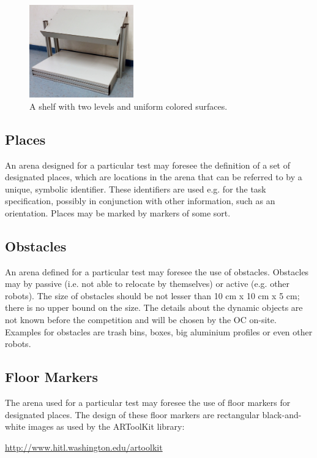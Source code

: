 \begin{figure} [h!]
\centering
\includegraphics[width=0.4\textwidth ]{./images/shelf.jpg}
\caption{A shelf with two levels and uniform colored surfaces.}
\label{fig:shelf}
\end{figure}


\subsection{Places}
An arena designed for a particular test may foresee the definition of a set of designated places, which are locations in the arena that can be referred to by a unique, symbolic identifier. These identifiers are used e.g. for the task specification, possibly in conjunction with other information, such as an orientation. Places may be marked by markers of some sort.

\subsection{Obstacles}
An arena defined for a particular test may foresee the use of obstacles. Obstacles may by passive (i.e. not able to relocate by themselves) or active (e.g. other robots). The size of obstacles should be not lesser than 10 cm x 10 cm x 5 cm; there is no upper bound on the size. The details about the dynamic objects are not known before the competition and will be chosen by the OC on-site. Examples for obstacles are trash bins, boxes, big aluminium profiles or even other robots.

\subsection{Floor Markers}
The arena used for a particular test may foresee the use of floor markers for designated places. The design of these floor markers are rectangular black-and-white images as used by the ARToolKit library:
\begin{center}
\url{http://www.hitl.washington.edu/artoolkit}
\end{center}

